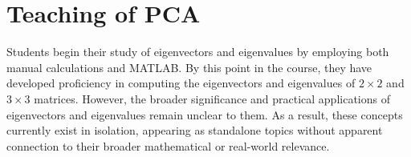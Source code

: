 \documentclass{article}
\begin{document}



\section{Teaching of PCA}
\label{sec:pca}
Students begin their study of eigenvectors and eigenvalues by employing both manual calculations and MATLAB. 
By this point in the course, they have developed proficiency in computing the eigenvectors and eigenvalues of $2 \times 2$ and $3 \times 3$ matrices.
However, the broader significance and practical applications of eigenvectors and eigenvalues remain unclear to them. 
As a result, these concepts currently exist in isolation, appearing as standalone topics without apparent connection to their broader mathematical or real-world relevance.
\end{document}
